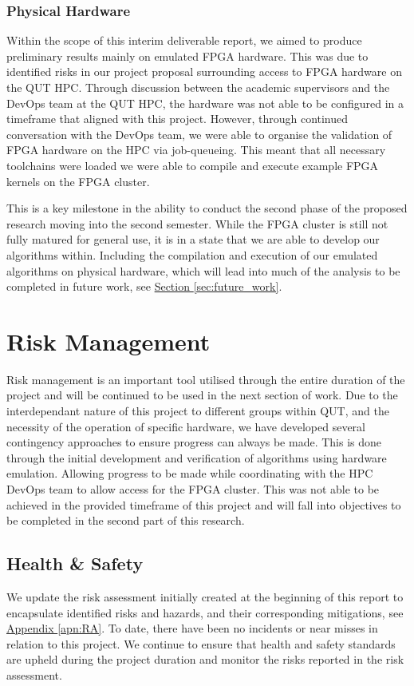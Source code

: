 \documentclass[11pt, a4paper]{article}
\newcommand{\refapn}[1]{\hyperref[#1]{Appendix \ref{#1}}}
\newcommand{\refsec}[1]{\hyperref[#1]{Section \ref{#1}}}
\begin{document}
	\subsubsection{Physical Hardware}
	Within the scope of this interim deliverable report, we aimed to produce preliminary results mainly on emulated FPGA hardware. This was due to identified risks in our project proposal surrounding access to FPGA hardware on the QUT HPC. Through discussion between the academic supervisors and the DevOps team at the QUT HPC, the hardware was not able to be configured in a timeframe that aligned with this project. However, through continued conversation with the DevOps team, we were able to organise the validation of FPGA hardware on the HPC via job-queueing. This meant that all necessary toolchains were loaded we were able to compile and execute example FPGA kernels on the FPGA cluster. 
	
	This is a key milestone in the ability to conduct the second phase of the proposed research moving into the second semester. While the FPGA cluster is still not fully matured for general use, it is in a state that we are able to develop our algorithms within. Including the compilation and execution of our emulated algorithms on physical hardware, which will lead into much of the analysis to be completed in future work, see \refsec{sec:future_work}.
	
	\section{Risk Management}
	Risk management is an important tool utilised through the entire duration of the project and will be continued to be used in the next section of work. Due to the interdependant nature of this project to different groups within QUT, and the necessity of the operation of specific hardware, we have developed several contingency approaches to ensure progress can always be made. This is done through the initial development and verification of algorithms using hardware emulation. Allowing progress to be made while coordinating with the HPC DevOps team to allow access for the FPGA cluster. This was not able to be achieved in the provided timeframe of this project and will fall into objectives to be completed in the second part of this research.
	
	\subsection{Health \& Safety}
	We update the risk assessment initially created at the beginning of this report to encapsulate identified risks and hazards, and their corresponding mitigations, see \refapn{apn:RA}. To date, there have been no incidents or near misses in relation to this project. We continue to ensure that health and safety standards are upheld during the project duration and monitor the risks reported in the risk assessment. 
	
\end{document}
